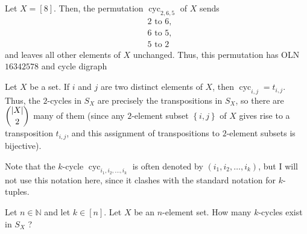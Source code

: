 \begin{example}
Let $X=\left[  8\right]  $. Then, the permutation $\operatorname*{cyc}%
\nolimits_{2,6,5}$ of $X$ sends
\begin{align*}
&  2\text{ to }6,\\
&  6\text{ to }5,\\
&  5\text{ to }2
\end{align*}
and leaves all other elements of $X$ unchanged. Thus, this permutation has OLN
$16342578$ and cycle digraph
\[%
\]

\end{example}

\begin{example}
Let $X$ be a set. If $i$ and $j$ are two distinct elements of $X$, then
$\operatorname*{cyc}\nolimits_{i,j}=t_{i,j}$. Thus, the $2$-cycles in $S_{X}$
are precisely the transpositions in $S_{X}$, so there are $\dbinom{\left\vert
X\right\vert }{2}$ many of them (since any $2$-element subset $\left\{
i,j\right\}  $ of $X$ gives rise to a transposition $t_{i,j}$, and this
assignment of transpositions to $2$-element subsets is bijective).
\end{example}

Note that the $k$-cycle $\operatorname*{cyc}\nolimits_{i_{1},i_{2}%
,\ldots,i_{k}}$ is often denoted by $\left(  i_{1},i_{2},\ldots,i_{k}\right)
$, but I will not use this notation here, since it clashes with the standard
notation for $k$-tuples.

\begin{exercise}
\label{exe.perm.cyc.how-many-kcyc}Let $n\in\mathbb{N}$ and let $k\in\left[
n\right]  $. Let $X$ be an $n$-element set. How many $k$-cycles exist in
$S_{X}$ ?
\end{exercise}

